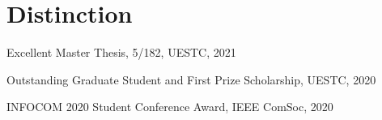 \vspace{-8pt}
\section*{Distinction}
\vspace{-4pt}
\indent


Excellent Master Thesis, 5/182, UESTC, 2021

Outstanding Graduate Student and First Prize Scholarship, UESTC, 2020

INFOCOM 2020 Student Conference Award, IEEE ComSoc, 2020
